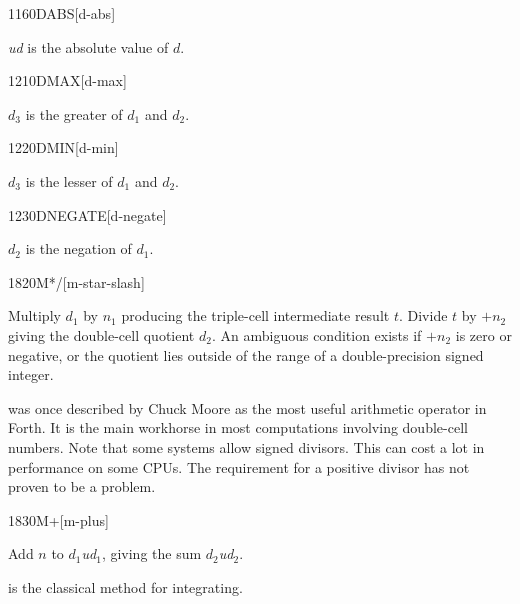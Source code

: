 \begin{newword}{1160}{DABS}[d-abs]

	\emph{ud} is the absolute value of $d$.
\end{newword}


\begin{newword}{1210}{DMAX}[d-max]

	$d_3$ is the greater of $d_1$ and $d_2$.
\end{newword}


\begin{newword}{1220}{DMIN}[d-min]

	$d_3$ is the lesser of $d_1$ and $d_2$.
\end{newword}


\begin{newword}{1230}{DNEGATE}[d-negate]

	$d_2$ is the negation of $d_1$.
\end{newword}


\begin{newword}{1820}{M*/}[m-star-slash]

	Multiply $d_1$ by $n_1$ producing the triple-cell intermediate
	result $t$. Divide $t$ by $+n_2$ giving the double-cell quotient
	$d_2$. An ambiguous condition exists if $+n_2$ is zero or
	negative, or the quotient lies outside of the range of a
	double-precision signed integer.

	\begin{rationale} %
		 was once described by Chuck Moore as the most
		useful arithmetic operator in Forth. It is the main workhorse
		in most computations involving double-cell numbers. Note that
		some systems allow signed divisors. This can cost a lot in
		performance on some CPUs. The requirement for a positive
		divisor has not proven to be a problem.
	\end{rationale}
\end{newword}


\begin{newword}{1830}{M+}[m-plus]

	Add $n$ to $d_1$\textbar\emph{ud}$_1$, giving the sum
	$d_2$\textbar\emph{ud}$_2$.

	\begin{rationale} %
		 is the classical method for integrating.
	\end{rationale}
\end{newword}


